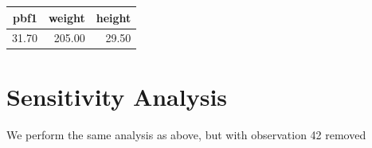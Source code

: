 \documentclass[11pt,letter]{article}\usepackage[]{graphicx}\usepackage[]{color}
\begin{document}
\begin{table}[ht]
\centering
\begin{tabular}{rrr}
  \hline
pbf1 & weight & height \\ 
  \hline
31.70 & 205.00 & 29.50 \\ 
   \hline
\end{tabular}
\end{table}


\FloatBarrier
\section{Sensitivity Analysis}

We perform the same analysis as above, but with observation 42 removed
\end{document}
